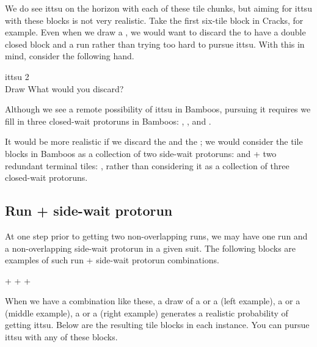 \noindent
We do see {\jap ittsu} on the horizon with each of these tile chunks, but aiming for {\jap ittsu} with these blocks is not very realistic. Take the first six-tile block in Cracks, for example. Even when we draw a {\large{}}, we would want to discard the {\large{}} to have a double closed block {\large{}} and a run {\large {}} rather than trying too hard to pursue {\jap ittsu}. 
With this in mind, consider the following hand. 

\begin{itembox}[r]{{\jap ittsu} 2}
\bp
{}~\\
\hspace{290pt}\footnotesize{Draw}
\ep
\vspace{-17pt}What would you discard? \vspace{-5pt}
\end{itembox}
\noindent
Although we see a remote possibility of {\jap ittsu} in Bamboos, pursuing it requires we fill in three closed-wait protoruns in Bamboos: {\large{}}, {\large{}}, and {\large{}}.

\bigskip
It would be more realistic if we discard the {\large{}} and the {\large{}}; we would consider the tile blocks in Bamboos as a collection of two side-wait protoruns: {\large{}} and {\large{}} + two redundant terminal tiles: {\large{} }, rather than considering it as a collection of three closed-wait protoruns.

\newpage
\subsection{Run + side-wait protorun}

At one step prior to getting two non-overlapping runs, we may have one run and a non-overlapping side-wait protorun in a given suit. The following blocks are examples of such run + side-wait protorun combinations.

\bigskip
{\LARGE {}+}  \hfill 
{\LARGE {}+} \hfill
{\LARGE {}+} 
\bigskip

\noindent
When we have a combination like these, a draw of a {\large{}} or a {\large{}} (left example), a {\large{}} or a {\large{}} (middle example), a {\large{}} or a {\large{}} (right example) generates a realistic probability of getting {\jap ittsu}. Below are the resulting tile blocks in each instance. You can pursue {\jap ittsu} with any of these blocks. 

